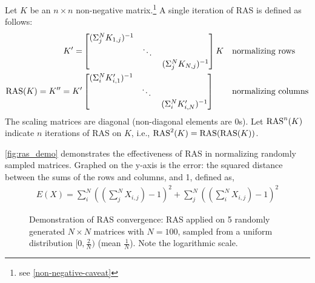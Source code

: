 Let $K$ be an $n\times n$ non-negative matrix.\footnote{see \autoref{non-negative-caveat}} A single iteration of RAS is defined as follows:
\begin{align}
        K'=&\begin{bmatrix}
                (\Sigma_j^N K_{1,j})^{-1}\\
                &\ddots{}\\
                &&(\Sigma_j^N K_{N,j})^{-1}
        \end{bmatrix}K &&\text{normalizing rows}\nonumber\\
            \operatorname{RAS}(K)=K''=K'&\begin{bmatrix}
                (\Sigma_i^N K'_{i,1})^{-1}\\
                &\ddots{}\\
                &&(\Sigma_i^N K'_{i,N})^{-1}
        \end{bmatrix}&&\text{normalizing columns}
\end{align}
The scaling matrices are diagonal (non-diagonal elements are $0$s). Let $\operatorname{RAS}^n(K)$ indicate $n$ iterations of RAS on $K$, i.e., $\operatorname{RAS}^2(K)=\operatorname{RAS}(\operatorname{RAS}(K))$.

\autoref{fig:ras_demo} demonstrates the effectiveness of RAS in normalizing randomly sampled matrices. Graphed on the y-axis is the error: the squared distance between the sums of the rows and columns, and 1, defined as,
\begin{align}
        E(X)=\sum^N_i\left(\left(\sum^N_jX_{i,j}\right)-1\right)^2+\sum^N_j\left(\left(\sum^N_iX_{i,j}\right)-1\right)^2
\end{align}

\begin{figure}[htpb]
        \centering
        
        \caption{Demonstration of RAS convergence: RAS applied on 5 randomly generated $N\times N$ matrices with $N=100$, sampled from a uniform distribution $[0,\frac{2}{N})$ (mean $\frac{1}{N}$). Note the logarithmic scale.}%
        \label{fig:ras_demo}
\end{figure}

